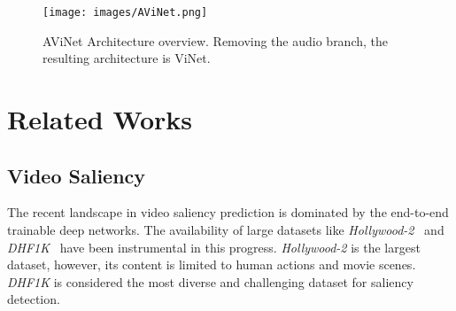 \documentclass[letterpaper, 10 pt, conference]{ieeeconf}  \usepackage{times}
\begin{document}
    






























\begin{figure*}[]
\texttt{[image: images/AViNet.png]}
\caption{AViNet Architecture overview. Removing the audio branch, the resulting architecture is ViNet. }
\label{fig:AViNet}
\end{figure*}

\section{Related Works}

\subsection{Video Saliency}

The recent landscape in video saliency prediction is dominated by the end-to-end trainable deep networks. The availability of large datasets like \emph{Hollywood-2}~\cite{marszalek2009actions} and \emph{DHF1K}~\cite{wang2018revisiting} have been instrumental in this progress. \emph{Hollywood-2} is the largest dataset, however, its content is limited to human actions and movie scenes. \emph{DHF1K} is considered the most diverse and challenging dataset for saliency detection.
\end{document}
